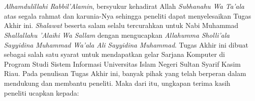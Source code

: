 %
%
%
%

\chapter*{\kataPengantar}
\textit{Alhamdulillahi Rabbil’Alamin}, bersyukur kehadirat Allah \textit{Subhanahu Wa Ta’ala} atas segala rahmat dan karunia-Nya sehingga peneliti dapat menyelesaikan Tugas Akhir ini. \textit{Shalawat} beserta salam selalu tercurahkan untuk Nabi Muhammad \textit{Shallallahu ’Alaihi Wa Sallam} dengan mengucapkan \textit{Allahumma Sholli’ala Sayyidina Muhammad Wa’ala Ali Sayyidina Muhammad}. Tugas Akhir ini dibuat sebagai salah satu syarat untuk mendapatkan gelar Sarjana Komputer di Program Studi Sistem Informasi Universitas Islam Negeri Sultan Syarif Kasim Riau. Pada penulisan Tugas Akhir ini, banyak pihak yang telah berperan dalam mendukung dan membantu peneliti. Maka dari itu, ungkapan terima kasih peneliti ucapkan kepada:

